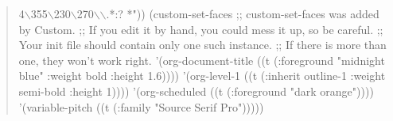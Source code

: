 \documentclass[11pt]{article}
\begin{document}
\begin{quote}
4$\backslash$355$\backslash$230$\backslash$270$\backslash$\)$\backslash$\).*: ? *"))
(custom-set-faces
 ;; custom-set-faces was added by Custom.
 ;; If you edit it by hand, you could mess it up, so be careful.
 ;; Your init file should contain only one such instance.
 ;; If there is more than one, they won't work right.
 '(org-document-title ((t (:foreground "midnight blue" :weight bold :height 1.6))))
 '(org-level-1 ((t (:inherit outline-1 :weight semi-bold :height 1))))
 '(org-scheduled ((t (:foreground "dark orange"))))
 '(variable-pitch ((t (:family "Source Serif Pro")))))
\end{quote}
\end{document}
